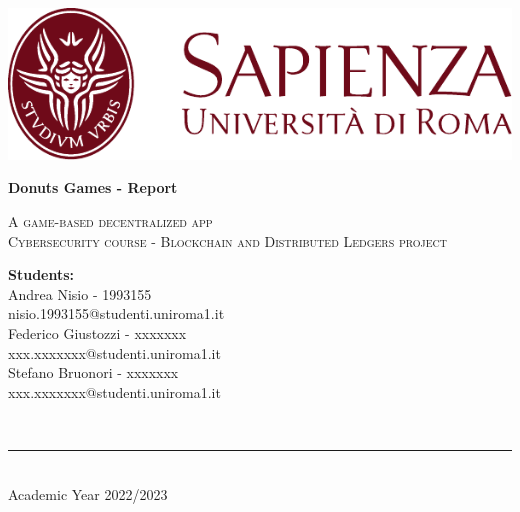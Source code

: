\begin{titlepage}
	\centering
    \vspace*{0.5 cm}
    \includegraphics[scale = 0.75]{src/SapienzaLogo.pdf}\\[1.0 cm]	%
 
    \vspace*{2cm}

    { \fontsize{20.74pt}{18.5pt}\selectfont\bfseries Donuts Games - Report\par } %

    \vspace*{0.25cm}
    \textsc{\Large A game-based decentralized app}\\[0.5 cm] %

    \vspace*{0.75cm}
    \textsc{\large Cybersecurity course - Blockchain and Distributed Ledgers project}\\[0.5 cm] %

    \vspace*{2.8cm}
	\begin{minipage}{1.0\textwidth} %
		\begin{centering} \large
			\textbf{Students:}\\
			Andrea Nisio - 1993155\\
            nisio.1993155@studenti.uniroma1.it\\
            \vspace{5mm}
            Federico Giustozzi - xxxxxxx\\
            xxx.xxxxxxx@studenti.uniroma1.it\\
            \vspace{5mm}
            Stefano Bruonori - xxxxxxx\\
            xxx.xxxxxxx@studenti.uniroma1.it\\
                  
		\end{centering}
	\end{minipage}\\[3.2cm]

    \vspace{1cm}
    \rule{\linewidth}{0.2 mm} \\[0.3 cm]
    \vspace*{-0.2cm}
    Academic Year 2022/2023
\end{titlepage}